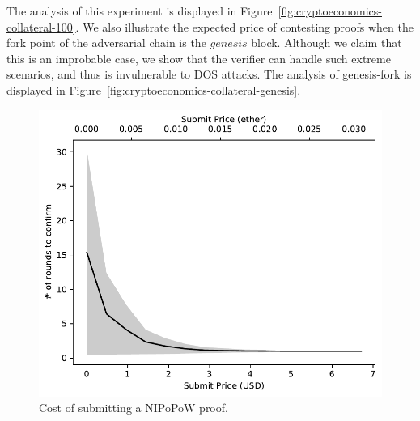 The analysis of this
experiment is displayed in Figure~\ref{fig:cryptoeconomics-collateral-100}. We
also illustrate the expected price of contesting proofs when the fork point of
the adversarial chain is the $genesis$ block. Although we claim that this is an
improbable case, we show that the verifier can handle such extreme scenarios,
and thus is invulnerable to DOS attacks.
The analysis of genesis-fork is displayed in
Figure~\ref{fig:cryptoeconomics-collateral-genesis}.

\begin{figure}[h]
\vspace*{-3mm}
    \begin{center}
        \includegraphics[width=0.7\columnwidth]{figures/cryptoeconomics-submit.pdf}
    \end{center}
    \caption{Cost of submitting a NIPoPoW proof.}
    \label{fig:cryptoeconomics-submit}
\end{figure}

